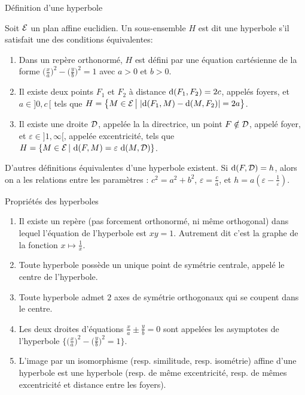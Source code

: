 \documentclass[11pt]{m53beamer}
\begin{document}
\begin{frame}{Définition d'une hyperbole}
  \begin{defprop}
    Soit $\mathcal{E}$ un plan affine euclidien. Un sous-ensemble $H$ est dit une \alert{hyperbole} s'il satisfait une des conditions équivalentes:
    \begin{enumerate}[<+(1)->]
      \item Dans un repère orthonormé, $H$ est défini par une équation cartésienne de la forme $\big(\frac{x}{a}\big)^{2}-\big(\frac{y}{b}\big)^{2}=1$ avec $a>0$ et $b>0$.
      \item Il existe deux points $F_{1}$ et $F_{2}$ à distance $\operatorname{d}(F_{1},F_{2})=2c$, appelés \alert{foyers},  et $a \in ]0,c\,[$ tels que $H = \big\{ M \in \mathcal{E} \,\big|\; |\!\operatorname{d}(F_{1},M)-\operatorname{d}(M,F_{2})|=2a\big\}$.
      \item Il existe une droite $\mathcal{D}$, appelée la \alert{la directrice}, un point $F \notin \mathcal{D}$, appelé \alert{foyer}, et $\varepsilon \in ]1,\infty[$, appelée \alert{excentricité}, tels que $H = \{ M \in \mathcal{E} \,|\, \operatorname{d}(F,M)=\varepsilon\,\operatorname{d}(M,\mathcal{D})\}$.
    \end{enumerate}
  \end{defprop}\pause
  D'autres définitions équivalentes d'une hyperbole existent.\pause{}\newline
  Si $\operatorname{d}(F,\mathcal{D})=h$, alors on a les relations entre les paramètres : $c^{2}=a^{2}+b^{2}$, $\varepsilon =\frac{c}{a}$, et $h=a(\varepsilon-\frac{1}{\varepsilon})$.
\end{frame}
\begin{frame}{Propriétés des hyperboles}
  \begin{enumerate}[<+(1)->]
    \item Il existe un repère (pas forcement orthonormé, ni même orthogonal) dans lequel l'équation de l'hyperbole est $xy=1$. Autrement dit c'est la graphe de la fonction $x\mapsto\frac{1}{x}$.
    \item Toute hyperbole possède un unique point de symétrie centrale, appelé \alert{le centre} de l'hyperbole.
    \item Toute hyperbole admet $2$ axes de symétrie orthogonaux qui se coupent dans le centre.
    \item Les deux droites d'équations $\frac{x}{a}\pm\frac{y}{b}=0$ sont appelées \alert{les asymptotes} de l'hyperbole $\big\{\big(\frac{x}{a}\big)^{2}-\big(\frac{y}{b}\big)^{2}=1\big\}$.
    \item L'image par un isomorphisme (resp. similitude, resp. isométrie) affine d'une hyperbole est une hyperbole (resp. de même excentricité, resp. de mêmes excentricité et distance entre les foyers).
  \end{enumerate}
\end{frame}
\end{document}
